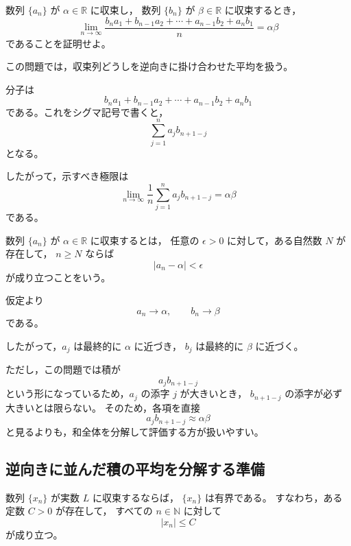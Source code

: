 \begin{exercise}
    数列 $\{a_n\}$ が $\alpha\in\mathbb{R}$ に収束し，
    数列 $\{b_n\}$ が $\beta\in\mathbb{R}$ に収束するとき，
    \[
        \lim_{n\to\infty}
        \frac{
            b_n a_1+b_{n-1}a_2+\cdots+a_{n-1}b_2+a_n b_1
        }{n}
        =
        \alpha\beta
    \]
    であることを証明せよ。
\end{exercise}
\begin{background}
    この問題では，収束列どうしを逆向きに掛け合わせた平均を扱う。

    分子は
    \[
        b_n a_1+b_{n-1}a_2+\cdots+a_{n-1}b_2+a_n b_1
    \]
    である。これをシグマ記号で書くと，
    \[
        \sum_{j=1}^{n}a_jb_{n+1-j}
    \]
    となる。

    したがって，示すべき極限は
    \[
        \lim_{n\to\infty}
        \frac{1}{n}
        \sum_{j=1}^{n}a_jb_{n+1-j}
        =
        \alpha\beta
    \]
    である。

    \begin{definition}[数列の収束]
		数列 $\{a_n\}$ が $\alpha\in\mathbb{R}$ に収束するとは，
        任意の $\epsilon>0$ に対して，ある自然数 $N$ が存在して，
        $n\geq N$ ならば
        \[
            |a_n-\alpha|<\epsilon
        \]
        が成り立つことをいう。
    \end{definition}

    \begin{remark}
        仮定より
        \[
            a_n\to\alpha,
            \qquad
            b_n\to\beta
        \]
        である。

        したがって，$a_j$ は最終的に $\alpha$ に近づき，
        $b_j$ は最終的に $\beta$ に近づく。

        ただし，この問題では積が
        \[
            a_jb_{n+1-j}
        \]
        という形になっているため，$a_j$ の添字 $j$ が大きいとき，
        $b_{n+1-j}$ の添字が必ず大きいとは限らない。
        そのため，各項を直接
        \[
            a_jb_{n+1-j}\approx \alpha\beta
        \]
        と見るよりも，和全体を分解して評価する方が扱いやすい。
    \end{remark}

    \subsection{逆向きに並んだ積の平均を分解する準備}

    \begin{lemma}[収束列は有界]
		数列 $\{x_n\}$ が実数 $L$ に収束するならば，
        $\{x_n\}$ は有界である。
        すなわち，ある定数 $C>0$ が存在して，
        すべての $n\in\mathbb{N}$ に対して
        \[
            |x_n|\leq C
        \]
        が成り立つ。
    \end{lemma}


\end{background}

